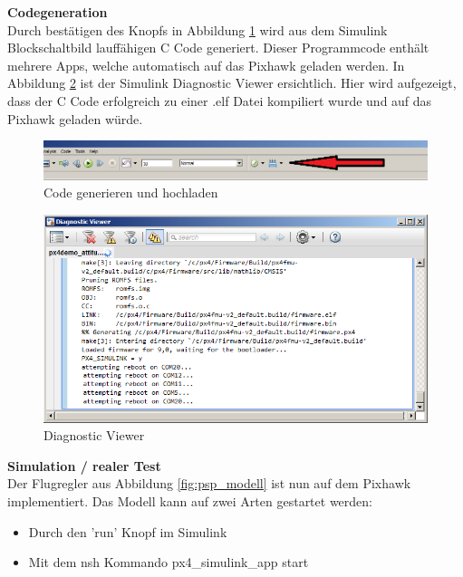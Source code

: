 \noindent
\textbf{Codegeneration}\\
Durch bestätigen des Knopfs in Abbildung \ref{fig:psp_generate} wird aus dem Simulink Blockschaltbild lauffähigen C Code generiert. Dieser Programmcode enthält mehrere Apps, welche automatisch auf das Pixhawk geladen werden. In Abbildung \ref{fig:psp_diagnostic} ist der Simulink Diagnostic Viewer ersichtlich. Hier wird aufgezeigt, dass der C Code erfolgreich zu einer .elf Datei kompiliert wurde und auf das Pixhawk geladen würde.

\begin{figure}[H]
  \begin{center}
  \includegraphics[scale=0.3]{pic/40_psp/psp_generate.png}
  \caption{Code generieren und hochladen}
  \label{fig:psp_generate}
  \end{center}
\end{figure}

\begin{figure}[H]
  \begin{center}
  \includegraphics[scale=0.3]{pic/40_psp/psp_upload.png}
  \caption{Diagnostic Viewer}
  \label{fig:psp_diagnostic}
  \end{center}
\end{figure}


\noindent
\textbf{Simulation / realer Test}\\
Der Flugregler aus Abbildung \ref{fig:psp_modell} ist nun auf dem Pixhawk implementiert. Das Modell kann auf zwei Arten gestartet werden:
\begin{itemize}
\item Durch den 'run' Knopf im Simulink
\item Mit dem nsh Kommando px4\_simulink\_app start
\end{itemize}

\medskip

